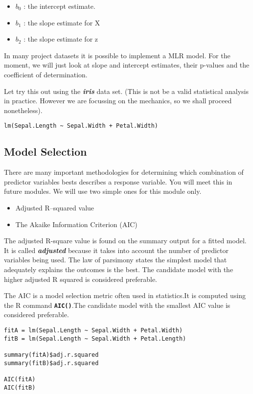 \begin{itemize}
\item	$b_0$ : the intercept estimate.
\item	$b_1$  : the slope estimate for X
\item	$b_2$  : the slope estimate for z
\end{itemize}

In many project datasets it is possible to implement a MLR model. For the moment, we will just look at slope and intercept estimates, their p-values and the coefficient of determination.

Let try this out using the \textbf{\textit{iris}} data set. (This is not be a valid statistical analysis in practice. However we are focussing on the mechanics, so we shall proceed nonetheless).
\begin{framed}
\begin{verbatim}
lm(Sepal.Length ~ Sepal.Width + Petal.Width)
\end{verbatim}
\end{framed}



\subsection{Model Selection}
There are many important methodologies for determining which combination of predictor variables bests describes a response variable. You will meet this in future modules.
We will use two simple ones for this module only.
\begin{itemize}
\item Adjusted R–squared value
\item The Akaike Information Criterion (AIC)
\end{itemize}


The adjusted R-square value is found on the summary output for a fitted model. It is called \textbf{\emph{adjusted}} because it takes into account the number of predictor variables being used. The law of parsimony states the simplest model that adequately explains the outcomes is the best. The candidate model with the higher adjusted R squared is considered preferable.

The AIC is a model selection metric often used in statistics.It is computed using the R command
\texttt{\textbf{AIC()}}.The candidate model with the smallest AIC value is considered preferable.

\begin{framed}
\begin{verbatim}
fitA = lm(Sepal.Length ~ Sepal.Width + Petal.Width)
fitB = lm(Sepal.Length ~ Sepal.Width + Petal.Length)

summary(fitA)$adj.r.squared
summary(fitB)$adj.r.squared

AIC(fitA)
AIC(fitB)
\end{verbatim}
\end{framed}

 